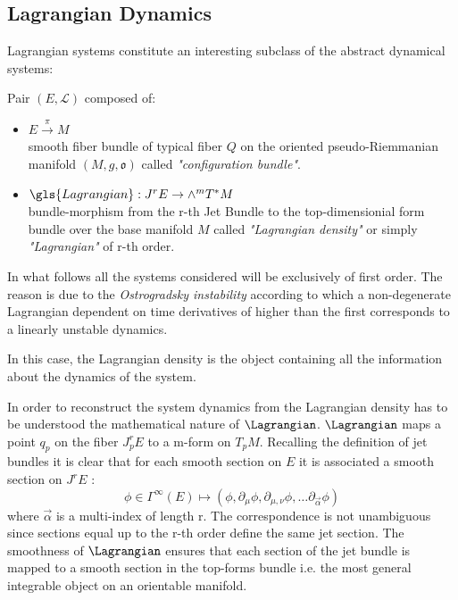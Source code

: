 \documentclass[Main]{subfiles}
\begin{document}
	\subsection{Lagrangian Dynamics}	
	Lagrangian systems constitute an interesting subclass of the abstract dynamical systems:
		\begin{definition}
	Pair $(E, \mathcal{L} )$ composed of:
		\begin{itemize}
			\item $E \xrightarrow{\pi} M$ \\smooth fiber bundle of typical fiber $Q$ on the oriented pseudo-Riemmanian manifold $(M,g,\mathfrak{o})$ called \emph{"configuration bundle"}.
			\item	$ \gls{Lagrangian} : J^r E \rightarrow \wedge^m T^*M$ \\bundle-morphism from the r-th Jet Bundle to  the top-dimensionial form bundle over the base manifold $M$  called \emph{"Lagrangian density"} or simply \emph{"Lagrangian"} of r-th order.
		\end{itemize}
	\end{definition}	
	
	\begin{NB}
		In what follows all the systems considered will be exclusively of first order.
		The reason is due to the \emph{Ostrogradsky instability} according to which a non-degenerate Lagrangian dependent on time derivatives of higher than the first corresponds to a linearly unstable dynamics.\cite{Motohashi2014}
	\end{NB}	
	
	
	In this case, the Lagrangian density is the object containing all the information about the dynamics of the system.

	In order to reconstruct the system dynamics from the Lagrangian density has to be understood the mathematical nature of $\Lagrangian$.
	$\Lagrangian$ maps a point $q_p$ on the fiber $J^r_p E$ to a m-form on $T_p M$.
	Recalling the definition of jet bundles it is clear that for each smooth section on $E$ it is associated a smooth section on $J^rE$ :
	\begin{displaymath}
		\phi \in \Gamma^\infty (E) \mapsto (\phi, \partial_\mu \phi, \partial_{\mu, \nu} \phi , \ldots \partial_{\vec{\alpha}}\phi)
	\end{displaymath}
	where  $\vec{\alpha}$ is a multi-index of length r.
	The correspondence is not unambiguous since sections equal up to the r-th order define the same jet section.
	The smoothness of $\Lagrangian$ ensures that each section of the jet bundle is mapped to a smooth section in the top-forms bundle i.e. the most general integrable object on an orientable manifold.
	
\end{document}
